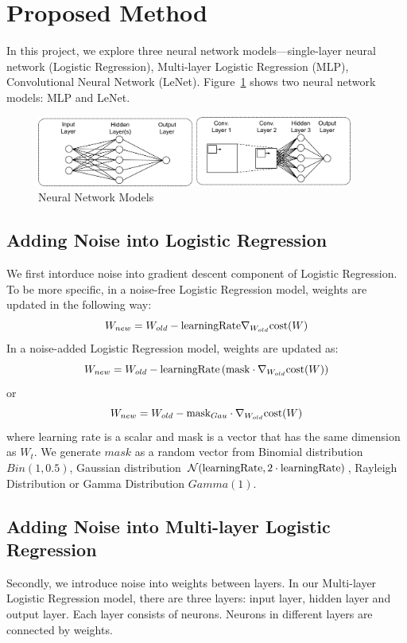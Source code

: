 \section{Proposed Method}
\label{sec:method}
In this project, we explore three neural network models---single-layer
neural network (Logistic Regression), Multi-layer Logistic Regression
(MLP), Convolutional Neural Network (LeNet).
Figure~\ref{fig:networks} shows two neural network models: MLP and LeNet.
\begin{figure}[!htbp]
\centering
\includegraphics[width=295pt]{f-figs/networks}
\caption{Neural Network Models}
\label{fig:networks}
\end{figure}

\subsection{Adding Noise into Logistic Regression}
We first intorduce noise into gradient descent component
of Logistic Regression.
To be more specific, in a noise-free Logistic Regression model, weights
are updated in the following way:
\[
W_{new} = W_{old} - \text{learningRate} \nabla_{W_{old}} \text{cost}(W)
\]
In a noise-added Logistic Regression model, weights are updated as:
\[
W_{new}=W_{old}-\text{learningRate} \left(\text{mask} \cdot \nabla_{W_{old}}\text{cost}(W) \right)
\]
or
\[
W_{new} = W_{old} - \text{mask}_{Gau} \cdot \nabla_{W_{old}} \text{cost}(W)
\]
where learning rate is a scalar and mask is a vector that has the same dimension as $W_t$.
We generate $mask$ as a random vector from Binomial distribution
$Bin(1,0.5)$, Gaussian distribution $\mathcal{N}(\text{learningRate}, 2 \cdot \text{learningRate})$,
Rayleigh Distribution or Gamma Distribution $Gamma(1)$.

\subsection{Adding Noise into Multi-layer Logistic Regression}
Secondly, we introduce noise into weights between layers.
In our Multi-layer Logistic Regression model, there are three layers:
input layer, hidden layer and output layer. Each layer consists of
neurons. Neurons in different layers are connected by weights.

